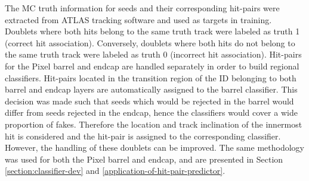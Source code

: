 The MC truth information for seeds and their corresponding hit-pairs were extracted from ATLAS tracking software and used as targets in training. Doublets where both hits belong to the same truth track were labeled as truth 1 (correct hit association). Conversely, doublets where both hits do not belong to the same truth track were labeled as truth 0 (incorrect hit association). Hit-pairs for the Pixel barrel and endcap are handled separately in order to build regional classifiers. Hit-pairs located in the transition region of the ID belonging to both barrel and endcap layers are automatically assigned to the barrel classifier. This decision was made such that seeds which would be rejected in the barrel would differ from seeds rejected in the endcap, hence the classifiers would cover a wide proportion of fakes. Therefore the location and track inclination of the innermost hit is considered and the hit-pair is assigned to the corresponding classifier. However, the handling of these doublets can be improved. The same methodology was used for both the Pixel barrel and endcap, and are presented in Section \ref{section:classifier-dev} and \ref{application-of-hit-pair-predictor}.






